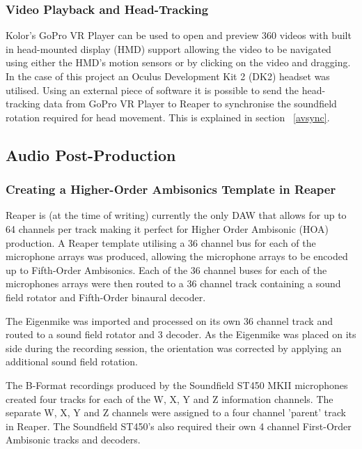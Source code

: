 			\subsubsection{Video Playback and Head-Tracking}
				 Kolor's GoPro VR Player \cite{GoProVR} can be used to open and preview 360 videos with built in head-mounted display (HMD) support allowing the video to be navigated using either the HMD's motion sensors or by clicking on the video and dragging. In the case of this project an Oculus Development Kit 2 (DK2) \cite{OculusDK2} headset was utilised. Using an external piece of software it is possible to send the head-tracking data from GoPro VR Player to Reaper to synchronise the soundfield rotation required for head movement. This is explained in section ~\ref{avsync}.


		\subsection{Audio Post-Production}
			
			\subsubsection{Creating a Higher-Order Ambisonics Template in Reaper}

				Reaper \cite{Reaper} is (at the time of writing) currently the only DAW that allows for up to 64 channels per track making it perfect for Higher Order Ambisonic (HOA) production. A Reaper template utilising a 36 channel bus for each of the microphone arrays was produced, allowing the microphone arrays to be encoded up to Fifth-Order Ambisonics. Each of the 36 channel buses for each of the microphones arrays were then routed to a 36 channel track containing a sound field rotator and Fifth-Order binaural decoder.
				
				The Eigenmike was imported and processed on its own 36 channel track and routed to a sound field rotator and 3 decoder. As the Eigenmike was placed on its side during the recording session, the orientation was corrected by applying an additional sound field rotation.

				The B-Format recordings produced by the Soundfield ST450 MKII microphones created four tracks for each of the W, X, Y and Z information channels. The separate W, X, Y and Z channels were assigned to a four channel 'parent' track in Reaper. The Soundfield ST450's also required their own 4 channel First-Order Ambisonic tracks and decoders.\\

